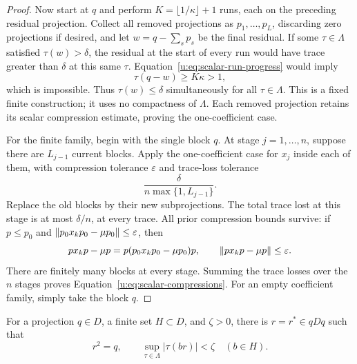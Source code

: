\begin{proof}
Now start at $q$ and perform $K=\lfloor1/\kappa\rfloor+1$ runs,
each on the preceding residual projection.  Collect all removed
projections as $p_1,\ldots,p_L$, discarding zero projections if desired,
and let $w=q-\sum_s p_s$ be the final residual.  If some
$\tau\in\Lambda$ satisfied $\tau(w)>\delta$, the residual at the start
of every run would have trace greater than $\delta$ at this same
$\tau$.  Equation~\eqref{u:eq:scalar-run-progress} would imply
\[
 \tau(q-w)\ge K\kappa>1,
\]
which is impossible.  Thus $\tau(w)\le\delta$ simultaneously for all
$\tau\in\Lambda$.  This is a fixed finite construction; it uses no
compactness of $\Lambda$.  Each removed projection retains its scalar
compression estimate, proving the one-coefficient case.

For the finite family, begin with the single block $q$.  At stage
$j=1,\ldots,n$, suppose there are $L_{j-1}$ current blocks.  Apply the
one-coefficient case for $x_j$ inside each of them, with compression
tolerance $\varepsilon$ and trace-loss tolerance
\[
 \frac{\delta}{n\max\{1,L_{j-1}\}}.
\]
Replace the old blocks by their new subprojections.  The total trace
lost at this stage is at most $\delta/n$, at every trace.  All prior
compression bounds survive: if $p\le p_0$ and
$\lVert p_0x_kp_0-\mu p_0\rVert\le\varepsilon$, then
\[
 px_kp-\mu p=p(p_0x_kp_0-\mu p_0)p,
 \qquad \lVert px_kp-\mu p\rVert\le\varepsilon.
\]
There are finitely many blocks at every stage.  Summing the trace
losses over the $n$ stages proves Equation~\eqref{u:eq:scalar-compressions}.
For an empty coefficient family, simply take the block $q$.
\end{proof}

\begin{lemma}
\label{u:lem:coefficient-symmetry}
For a projection $q\in D$, a finite set $H\subset D$, and $\zeta>0$,
there is $r=r^*\in qDq$ such that
\begin{equation}
\label{u:eq:coefficient-symmetry}
 r^2=q,
 \qquad
 \sup_{\tau\in\Lambda}|\tau(br)|<\zeta
 \quad(b\in H).
\end{equation}
\end{lemma}

